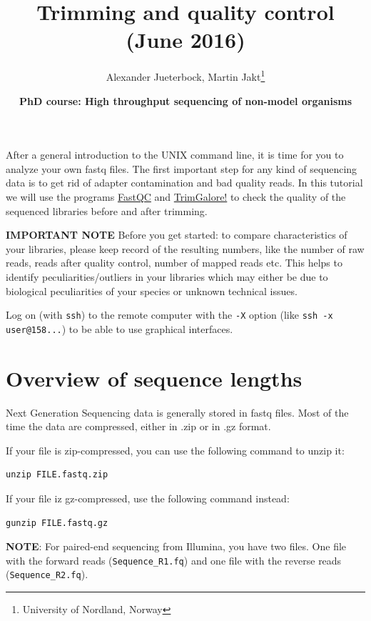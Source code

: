 \documentclass[11pt]{article}
\author{Alexander Jueterbock, Martin Jakt\thanks{University of Nordland, Norway}}
\date{\textbf{PhD course: High throughput sequencing of non-model organisms}}
\title{\textbf{Trimming and quality control} (June 2016)}
\begin{document}
\maketitle
\tableofcontents







After a general introduction to the UNIX command line, it is time for
you to analyze your own fastq files. The first important step for any
kind of sequencing data is to get rid of adapter contamination and 
bad quality reads. In this tutorial we will use the programs \href{http://www.bioinformatics.babraham.ac.uk/projects/fastqc/}{FastQC}
and \href{http://www.bioinformatics.babraham.ac.uk/projects/trim_galore/}{TrimGalore!} to check the quality of the sequenced libraries before
and after trimming.


\textbf{IMPORTANT NOTE} Before you get started: to compare characteristics of
your libraries, please keep record of the resulting numbers, like the
number of raw reads, reads after quality control, number of mapped
reads etc. This helps to identify peculiarities/outliers in your
libraries which may either be due to biological peculiarities of your
species or unknown technical issues.


Log on (with \texttt{ssh}) to the remote computer with the \texttt{-X} option (like
\texttt{ssh -x user@158...}) to be able to use graphical interfaces.

\section{Overview of sequence lengths}
\label{sec-1}
Next Generation Sequencing data is generally stored in fastq
files. Most of the time the data are compressed, either in .zip or in
.gz format.

If your file is zip-compressed, you can use the following command to unzip it:

\begin{verbatim}
unzip FILE.fastq.zip
\end{verbatim}

If your file iz gz-compressed, use the following command instead:

\begin{verbatim}
gunzip FILE.fastq.gz
\end{verbatim}

\textbf{NOTE}: For paired-end sequencing from Illumina, you have two
files. One file with the forward reads (\texttt{Sequence\_R1.fq}) and one file with
the reverse reads (\texttt{Sequence\_R2.fq}).
\end{document}
